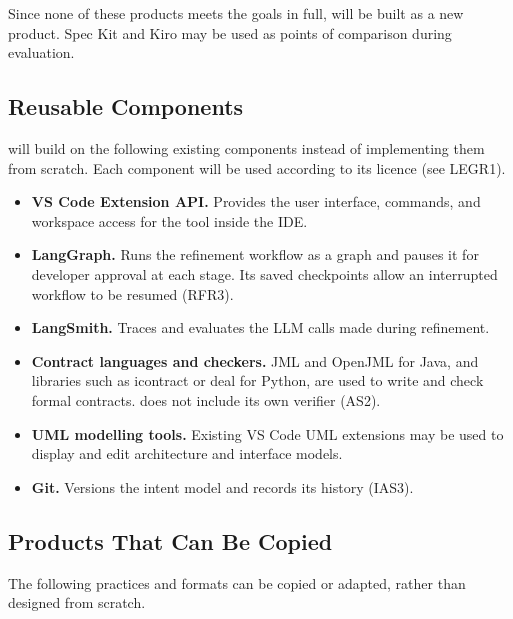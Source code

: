 \documentclass[12pt]{article}
\begin{document}
Since none of these products meets the goals in full, \progname{} will be built
as a new product. Spec Kit and Kiro may be used as points of comparison during
evaluation.

\subsection{Reusable Components}

\progname{} will build on the following existing components instead of
implementing them from scratch. Each component will be used according to its
licence (see LEGR1).

\begin{itemize}
  \item \textbf{VS Code Extension API.} Provides the user interface, commands,
  and workspace access for the tool inside the IDE.
  
  \item \textbf{LangGraph.} Runs the refinement workflow as a graph and pauses
  it for developer approval at each stage. Its saved checkpoints allow an
  interrupted workflow to be resumed (RFR3).
  \item \textbf{LangSmith.} Traces and evaluates the LLM calls made during
  refinement.
  \item \textbf{Contract languages and checkers.} JML and OpenJML for Java, and
  libraries such as icontract or deal for Python, are used to write and check
  formal contracts. \progname{} does not include its own verifier (AS2).
  \item \textbf{UML modelling tools.} Existing VS Code UML extensions may be
  used to display and edit architecture and interface models.
  \item \textbf{Git.} Versions the intent model and records its history (IAS3).
\end{itemize}

\subsection{Products That Can Be Copied}

The following practices and formats can be copied or adapted, rather than
designed from scratch.
\end{document}
